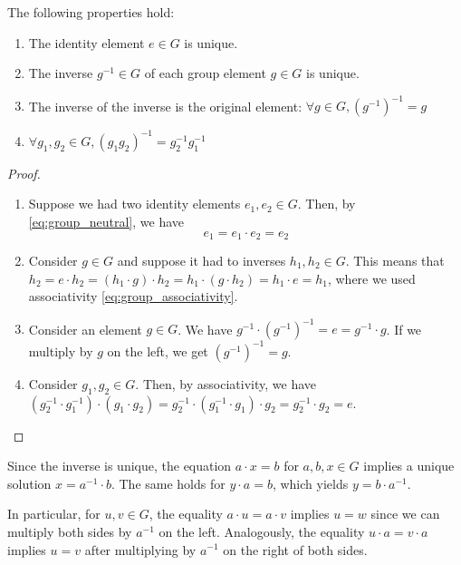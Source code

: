 \begin{proposition}
    The following properties hold:
    \begin{enumerate}
        \item The identity element $e \in G$ is unique. \label{prop:unique_neutral}
        \item The inverse $g^{-1} \in G$ of each group element $g \in G$ is unique. \label{prop:unique_inverse}
        \item The inverse of the inverse is the original element: $\forall g \in G, (g^{-1})^{-1} = g$ \label{prop:inv_of_inv}
        \item $\forall g_1, g_2 \in G, (g_1 g_2)^{-1} = g_2^{-1} g_1^{-1}$ \label{prop:reverse_inv}
    \end{enumerate}
\end{proposition}
\begin{proof}
    \begin{enumerate}
        \item Suppose we had two identity elements $e_1, e_2 \in G$.
        Then, by \eqref{eq:group_neutral}, we have
        \begin{equation*}
            e_1 = e_1 \cdot e_2 = e_2
        \end{equation*}

        \item Consider $g \in G$ and suppose it had to inverses $h_1, h_2 \in G$.
        This means that $h_2 = e \cdot h_2 = (h_1 \cdot g) \cdot h_2 = h_1 \cdot (g \cdot h_2) = h_1 \cdot e = h_1$, where we used associativity \eqref{eq:group_associativity}.

        \item Consider an element $g \in G$. We have $g^{-1} \cdot (g^{-1})^{-1} = e = g^{-1} \cdot g$. If we multiply by $g$ on the left, we get $(g^{-1})^{-1} = g$.

        \item Consider $g_1, g_2 \in G$. Then, by associativity, we have $(g_2^{-1} \cdot g_1^{-1}) \cdot (g_1 \cdot g_2) = g_2^{-1} \cdot (g_1^{-1} \cdot g_1) \cdot g_2 = g_2^{-1} \cdot g_2 = e$.
    \end{enumerate}
\end{proof}

\begin{remark}
    Since the inverse is unique, the equation $a \cdot x = b$ for $a, b, x \in G$ implies a unique solution $x = a^{-1} \cdot b$. The same holds for $y \cdot a = b$, which yields $y = b \cdot a^{-1}$.

    In particular, for $u, v \in G$, the equality $a \cdot u = a \cdot v$ implies $u = w$ since we can multiply both sides by $a^{-1}$ on the left. Analogously, the equality $u \cdot a = v \cdot a$ implies $u = v$ after multiplying by $a^{-1}$ on the right of both sides.
\end{remark}

